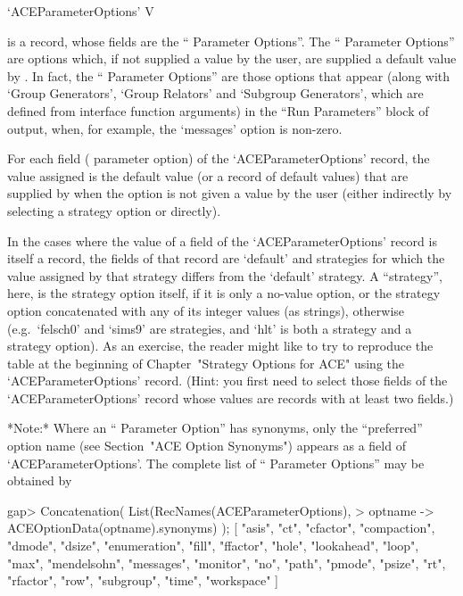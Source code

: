\>`ACEParameterOptions' V

is a {\GAP} record, whose fields are the ``{\ACE} Parameter Options''.
The ``{\ACE} Parameter Options'' are options which, if not supplied  a
value by the user, are supplied a default value by  {\ACE}.  In  fact,
the ``{\ACE} Parameter Options'' are those options that appear  (along
with `Group Generators', `Group Relators' and  `Subgroup  Generators',
which are defined from {\ACE} interface  function  arguments)  in  the
``Run Parameters'' block of {\ACE}  output,  when,  for  example,  the
`messages' option is non-zero.

For each field ({\ACE} parameter option) of the  `ACEParameterOptions'
record, the value assigned is  the  default  value  (or  a  record  of
default values) that are supplied by {\ACE} when  the  option  is  not
given a value by the user (either indirectly by selecting  a  strategy
option or directly).

In the cases where the value of a field of  the  `ACEParameterOptions'
record is itself a record, the fields of that record are `default' and
strategies for which the value assigned by that strategy differs  from
the `default' strategy. A ``strategy'', here, is the  strategy  option
itself, if it is only  a  no-value  option,  or  the  strategy  option
concatenated with any of its integer values  (as  strings),  otherwise
(e.g.~`felsch0' and `sims9'  are  strategies,  and  `hlt'  is  both  a
strategy and a strategy option). As an exercise, the reader might like
to try to reproduce the table at the  beginning  of  Chapter~"Strategy
Options for ACE" using the `ACEParameterOptions'  record.  (Hint:  you
first need to select those fields of the `ACEParameterOptions'  record
whose values are records with at least two fields.)

*Note:*
Where  an  ``{\ACE}  Parameter  Option''  has   synonyms,   only   the
``preferred'' option name (see Section~"ACE Option Synonyms")  appears
as a field of `ACEParameterOptions'. The  complete  list  of  ``{\ACE}
Parameter Options'' may be obtained by

\beginexample
gap> Concatenation( List(RecNames(ACEParameterOptions),                    
>                        optname -> ACEOptionData(optname).synonyms) ); 
[ "asis", "ct", "cfactor", "compaction", "dmode", "dsize", "enumeration", 
  "fill", "ffactor", "hole", "lookahead", "loop", "max", "mendelsohn", 
  "messages", "monitor", "no", "path", "pmode", "psize", "rt", "rfactor", 
  "row", "subgroup", "time", "workspace" ]
\endexample

